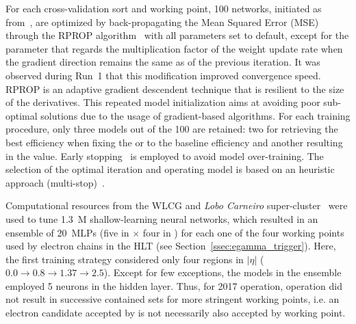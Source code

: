 For each cross-validation sort and working point, 100 networks, initiated
as from~\cite{initnw}, are optimized by back-propagating the Mean Squared Error (MSE) through the RPROP
algorithm~\cite{rprop} with all parameters set to default,
except for the parameter that regards the multiplication factor of the weight update rate when the gradient direction remains the same as of the previous iteration. It was 
observed during Run~1 that this modification improved convergence speed. RPROP
is an adaptive gradient descendent technique that is resilient to the size of
the derivatives. This repeated model initialization aims at
avoiding poor sub-optimal solutions due to the usage of gradient-based algorithms.
For each training procedure, only three models out of the 100 are retained: two
for retrieving the best efficiency when fixing the \pd{} or \pf{} to the
baseline \fastcalo{} efficiency and another resulting in the \spmax{} value.
Early stopping~\cite{haykin_2008} is employed to avoid model over-training. The
selection of the optimal iteration and operating model is based on an heuristic approach (multi-stop)~\cite{Goodfellow2016}.


Computational resources from the WLCG and \emph{Lobo Carneiro}
super-cluster~\cite{lobo_carneiro} were used to tune 1.3~M shallow-learning
neural networks, which resulted in an ensemble of \SI{20}{MLPs} (five in \et{}
$\times$ four in \abseta{}) for each one of the four working points used by
electron chains in the HLT (see Section~\ref{ssec:egamma_trigger}).
Here, the first training strategy considered only four regions in $|\eta|$ ($0.0\rightarrow 0.8\rightarrow1.37\rightarrow2.5$).
Except for few exceptions, the models in the ensemble employed 5 neurons in the 
hidden layer.  Thus, for 2017 operation, 
\rnn{} operation did not result in
successive contained sets for more stringent working points, i.e. an electron
candidate accepted by \medium{} is not necessarily also accepted by \loose{}
working point. %


